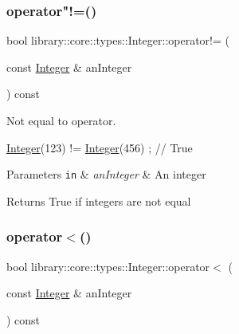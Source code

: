 \subsubsection{\texorpdfstring{operator"!=()}{operator!=()}}
{\footnotesize\ttfamily bool library\+::core\+::types\+::\+Integer\+::operator!= (\begin{DoxyParamCaption}\item[{const \hyperlink{classlibrary_1_1core_1_1types_1_1_integer}{Integer} \&}]{an\+Integer }\end{DoxyParamCaption}) const}



Not equal to operator. 


\begin{DoxyCode}
\hyperlink{classlibrary_1_1core_1_1types_1_1_integer_a6483b1c4e13e5ed6af5e7a58347efead}{Integer}(123) != \hyperlink{classlibrary_1_1core_1_1types_1_1_integer_a6483b1c4e13e5ed6af5e7a58347efead}{Integer}(456) ; \textcolor{comment}{// True}
\end{DoxyCode}



\begin{DoxyParams}[1]{Parameters}
\mbox{\tt in}  & {\em an\+Integer} & An integer \\
\hline
\end{DoxyParams}
\begin{DoxyReturn}{Returns}
True if integers are not equal 
\end{DoxyReturn}
\mbox{\label{classlibrary_1_1core_1_1types_1_1_integer_a7f179765edbdeb186cde5e869021ccb6}} 
\subsubsection{\texorpdfstring{operator$<$()}{operator<()}}
{\footnotesize\ttfamily bool library\+::core\+::types\+::\+Integer\+::operator$<$ (\begin{DoxyParamCaption}\item[{const \hyperlink{classlibrary_1_1core_1_1types_1_1_integer}{Integer} \&}]{an\+Integer }\end{DoxyParamCaption}) const}



